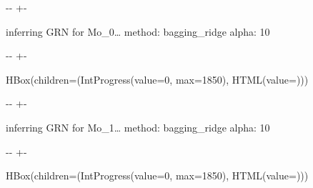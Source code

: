 \documentclass[letterpaper,10pt,english]{sphinxmanual}
\newlength\nbsphinxcodecellspacing
\begin{document}
%
{
\kern-\sphinxverbatimsmallskipamount\kern-\baselineskip
\kern+\FrameHeightAdjust\kern-\fboxrule
\vspace{\nbsphinxcodecellspacing}
%
\begin{sphinxVerbatim}[commandchars=\\\{\}]

inferring GRN for Mo\_0{\ldots}
method: bagging\_ridge
alpha: 10
\end{sphinxVerbatim}
}
\relax

{

\kern-\sphinxverbatimsmallskipamount\kern-\baselineskip
\kern+\FrameHeightAdjust\kern-\fboxrule
\vspace{\nbsphinxcodecellspacing}

%
\begin{sphinxVerbatim}[commandchars=\\\{\}]
HBox(children=(IntProgress(value=0, max=1850), HTML(value=\PYGZsq{}\PYGZsq{})))
\end{sphinxVerbatim}
}



%
{
\kern-\sphinxverbatimsmallskipamount\kern-\baselineskip
\kern+\FrameHeightAdjust\kern-\fboxrule
\vspace{\nbsphinxcodecellspacing}
%
\begin{sphinxVerbatim}[commandchars=\\\{\}]

inferring GRN for Mo\_1{\ldots}
method: bagging\_ridge
alpha: 10
\end{sphinxVerbatim}
}
\relax

{

\kern-\sphinxverbatimsmallskipamount\kern-\baselineskip
\kern+\FrameHeightAdjust\kern-\fboxrule
\vspace{\nbsphinxcodecellspacing}

%
\begin{sphinxVerbatim}[commandchars=\\\{\}]
HBox(children=(IntProgress(value=0, max=1850), HTML(value=\PYGZsq{}\PYGZsq{})))
\end{sphinxVerbatim}
}
\end{document}
